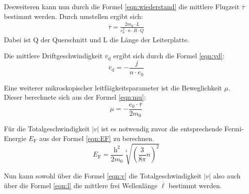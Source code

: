 Desweiteren kann nun durch die Formel \eqref{eqn:wiederstand} die mittlere
Flugzeit $\overline\tau$ bestimmt werden. Durch umstellen ergibt sich:
\begin{align}
  \overline{\tau}=\frac{2m_0\cdot L}{e_0^2 \cdot n \cdot R \cdot Q}
\end{align}
Dabei ist Q der Querschnitt und L die Länge der Leiterplatte.

Die mittlere Driftgeschwindigkeit $\overline{v}_\mathrm{d}$ ergibt sich durch die Formel \eqref{eqn:vd}:
\begin{equation}
  \overline{v}_\mathrm{d}=-\frac{j}{n \cdot e_0}\label{eqn:vd}
\end{equation}

Eine weiterer mikroskopischer leitfäigkeitsparameter ist die Beweglichkeit $\mu$.
Dieser berechnete sich aus der Formel \eqref{eqn:mu}:
\begin{equation}
\mu=-\frac{e_0\cdot\overline{\tau}}{2m_0}\label{eqn:mu}
\end{equation}

Für die Totalgeschwindigkeit $|v|$ ist es notwendig zuvor die entsprechende Fermi-Energie
$E_\mathrm{F}$ aus der Formel \eqref{eqn:EF} zu berechnen.
\begin{equation}
E_\mathrm{F}=\frac{\mathrm{h}^2}{2m_0}\sqrt[3]{\left(\frac{3}{8\pi}n\right)^2}\label{eqn:vd}
\end{equation}

Nun  kann sowohl über die Formel \ref{eqn:v} die Totalgeschwindigkeit $|v|$ also auch
über die Formel \ref{eqn:l} die mittlere frei Wellenlänge  $\overline{\ell}$ bestimmt werden.
